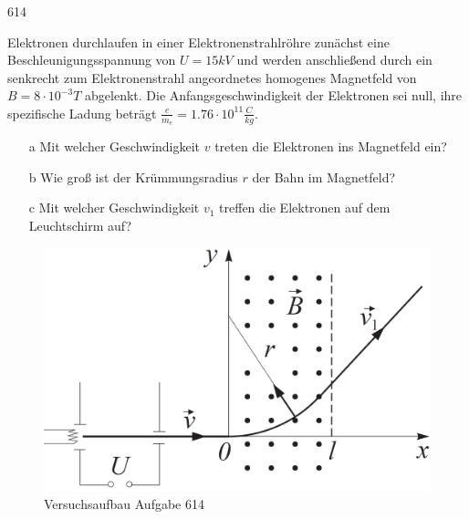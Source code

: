 \begin{auf}
    614
\end{auf}
Elektronen durchlaufen in einer Elektronenstrahlröhre zunächst eine Beschleunigungsspannung von $U=15kV$ und werden anschließend durch ein senkrecht zum Elektronenstrahl angeordnetes homogenes Magnetfeld von $B=8\cdot10^{-3}T$ abgelenkt. Die Anfangsgeschwindigkeit der Elektronen sei null, ihre spezifische Ladung beträgt $\frac{e}{m_e}=1.76\cdot10^{11}\frac{C}{kg}$.
\begin{enumerate}
    \item[a] Mit welcher Geschwindigkeit $v$ treten die Elektronen ins Magnetfeld ein?
    \item[b] Wie groß ist der Krümmungsradius $r$ der Bahn im Magnetfeld?
    \item[c] Mit welcher Geschwindigkeit $v_1$ treffen die Elektronen auf dem Leuchtschirm auf?
\end{enumerate}
\begin{figure}[h]
    \centering
    \includegraphics[width=0.7\linewidth]{images/614_0.png}
    \caption{Versuchsaufbau Aufgabe 614}
\end{figure}